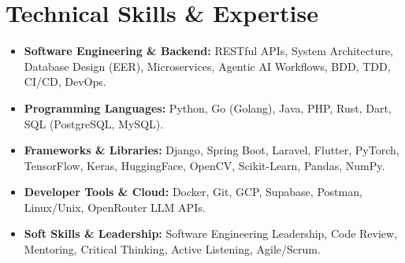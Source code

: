\documentclass[letterpaper,10pt]{article}
\begin{document}
\section{Technical Skills \& Expertise}
\vspace{1pt}

\begin{itemize}[leftmargin=0.15in, itemsep=1.0pt]
    \item \textbf{Software Engineering \& Backend:} RESTful APIs, System Architecture, Database Design (EER), Microservices, Agentic AI Workflows, BDD, TDD, CI/CD, DevOps.
    \item \textbf{Programming Languages:} Python, Go (Golang), Java, PHP, Rust, Dart, SQL (PostgreSQL, MySQL).
    \item \textbf{Frameworks \& Libraries:} Django, Spring Boot, Laravel, Flutter, PyTorch, TensorFlow, Keras, HuggingFace, OpenCV, Scikit-Learn, Pandas, NumPy.
    \item \textbf{Developer Tools \& Cloud:} Docker, Git, GCP, Supabase, Postman, Linux/Unix, OpenRouter LLM APIs.
    \item \textbf{Soft Skills \& Leadership:} Software Engineering Leadership, Code Review, Mentoring, Critical Thinking, Active Listening, Agile/Scrum.
\end{itemize}
\end{document}
